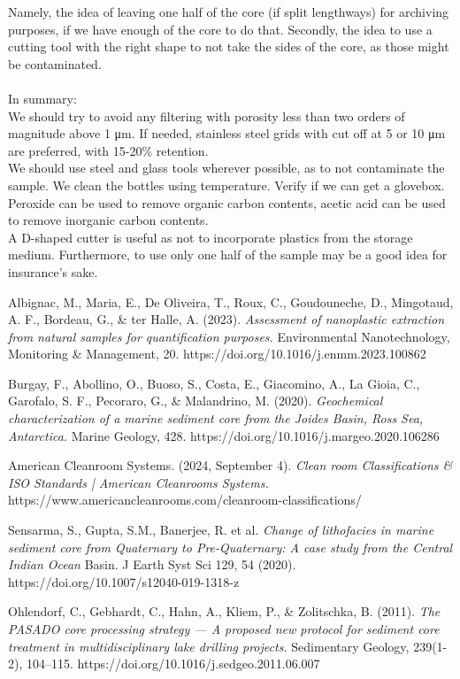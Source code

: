 \documentclass[twocolumn,a4paper,aps,amsmath,amssymb,floatfix,superscriptaddress]{revtex4-2}
\begin{document}
	Namely, the idea of leaving one half of the core (if split lengthways) for archiving purposes, if we have enough of the core to do that. Secondly, the idea to use a cutting tool with the right shape to not take the sides of the core, as those might be contaminated.\\
	\\
	In summary:\\
	We should try to avoid any filtering with porosity less than two orders of magnitude above 1 μm. If needed, stainless steel grids with cut off at 5 or 10 μm are preferred, with 15-20\% retention.\\
	We should use steel and glass tools wherever possible, as to not contaminate the sample.
	We clean the bottles using temperature. Verify if we can get a glovebox.\\
	Peroxide can be used to remove organic carbon contents, acetic acid can be used to remove inorganic carbon contents.\\
	A D-shaped cutter is useful as not to incorporate plastics from the storage medium. Furthermore, to use only one half of the sample may be a good idea for insurance's sake.
	\begin{thebibliography}{10}
		
		Albignac, M., Maria, E., De Oliveira, T., Roux, C., Goudouneche, D., Mingotaud, A. F., Bordeau, G., \& ter Halle, A. (2023). \textit{Assessment of nanoplastic extraction from natural samples for quantification purposes.} Environmental Nanotechnology, Monitoring \& Management, 20. https://doi.org/10.1016/j.enmm.2023.100862
		
		Burgay, F., Abollino, O., Buoso, S., Costa, E., Giacomino, A., La Gioia, C., Garofalo, S. F., Pecoraro, G., \& Malandrino, M. (2020). \textit{Geochemical characterization of a marine sediment core from the Joides Basin, Ross Sea, Antarctica.} Marine Geology, 428. https://doi.org/10.1016/j.margeo.2020.106286 
				
		American Cleanroom Systems. (2024, September 4). \textit{Clean room Classifications \& ISO Standards | American Cleanrooms Systems.} https://www.americancleanrooms.com/cleanroom-classifications/
		
		Sensarma, S., Gupta, S.M., Banerjee, R. et al. \textit{Change of lithofacies in marine sediment core from Quaternary to Pre-Quaternary: A case study from the Central Indian Ocean} Basin. J Earth Syst Sci 129, 54 (2020). https://doi.org/10.1007/s12040-019-1318-z 
		
		Ohlendorf, C., Gebhardt, C., Hahn, A., Kliem, P., \& Zolitschka, B. (2011). \textit{The PASADO core processing strategy — A proposed new protocol for sediment core treatment in multidisciplinary lake drilling projects.} Sedimentary Geology, 239(1-2), 104–115. https://doi.org/10.1016/j.sedgeo.2011.06.007
	\end{thebibliography}
	
\end{document}
